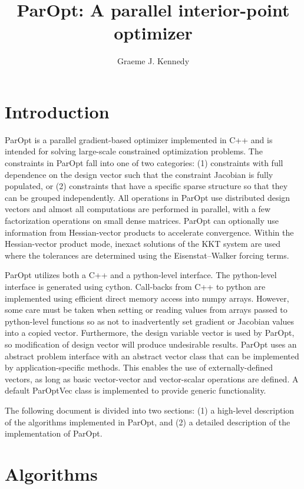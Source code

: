 \documentclass[12pt]{article}
\title{ParOpt: A parallel interior-point optimizer}
\author{Graeme J. Kennedy}
\date{}
\begin{document}
\maketitle

\section{Introduction}

ParOpt is a parallel gradient-based optimizer implemented in C++ and is intended for solving large-scale constrained optimization problems.
The constraints in ParOpt fall into one of two categories: (1) constraints with full dependence on the design vector such that the constraint Jacobian is fully populated, or (2) constraints that have a specific sparse structure so that they can be grouped independently.
All operations in ParOpt use distributed design vectors and almost all computations are performed in parallel, with a few factorization operations on small dense matrices.
ParOpt can optionally use information from Hessian-vector products to accelerate convergence.
Within the Hessian-vector product mode, inexact solutions of the KKT system are used where the tolerances are determined using the Eisenstat--Walker forcing terms.

ParOpt utilizes both a C++ and a python-level interface.
The python-level interface is generated using cython.
Call-backs from C++ to python are implemented using efficient direct memory access into numpy arrays.
However, some care must be taken when setting or reading values from arrays passed to python-level functions so as not to inadvertently set gradient or Jacobian values into a copied vector.
Furthermore, the design variable vector is used by ParOpt, so modification of design vector will produce undesirable results.
ParOpt uses an abstract problem interface with an abstract vector class that can be implemented by application-specific methods.
This enables the use of externally-defined vectors, as long as basic vector-vector and vector-scalar operations are defined.
A default ParOptVec class is implemented to provide generic functionality.

The following document is divided into two sections: (1) a high-level description of the algorithms implemented in ParOpt, and (2) a detailed description of the implementation of ParOpt.

\section{Algorithms}
\end{document}
